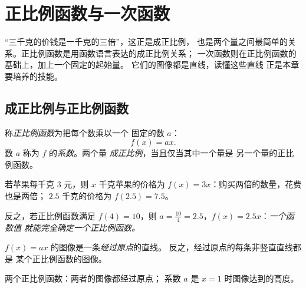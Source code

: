 \chapter{正比例函数与一次函数}\label{ch:g9:linfunc}

“三千克的价钱是一千克的三倍”，这正是成正比例，
也是两个量之间最简单的关系。正比例函数是用函数语言表达的成正比例关系；
一次函数则在正比例函数的基础上，加上一个固定的起始量。
它们的图像都是直线，读懂这些直线
正是本章要培养的技能。

\section{成正比例与正比例函数}

\begin{definition}[正比例函数]\label{def:g9:linfunc:linear}
称\emph{正比例函数}为把每个数乘以一个
固定的数 $a$：
\[
f(x) = a x .
\]
数 $a$ 称为 $f$ 的\emph{系数}。两个量
\emph{成正比例}，当且仅当其中一个量是
另一个量的正比例函数。
\end{definition}

\begin{example}\label{ex:g9:linfunc:linear}
若苹果每千克 $3$ 元，则 $x$ 千克苹果的价格为
$f(x) = 3x$：购买两倍的数量，花费也是两倍；
$2.5$ 千克的价格为 $f(2.5) = 7.5$。

反之，若正比例函数满足 $f(4) = 10$，则
$a = \frac{10}{4} = 2.5$，$f(x) = 2.5x$：\emph{一个函数值
就能完全确定一个正比例函数。}
\end{example}

\begin{proposition}[正比例函数的图像]\label{prop:g9:linfunc:lineargraph}
$f(x) = ax$ 的图像是一条\emph{经过原点}的直线。
反之，经过原点的每条非竖直直线都是
某个正比例函数的图像。
\end{proposition}
\admitted

\begin{omfigure}

{\small 两个正比例函数：两者的图像都经过原点；
系数 $a$ 是 $x = 1$ 时图像达到的高度。}
\end{omfigure}

